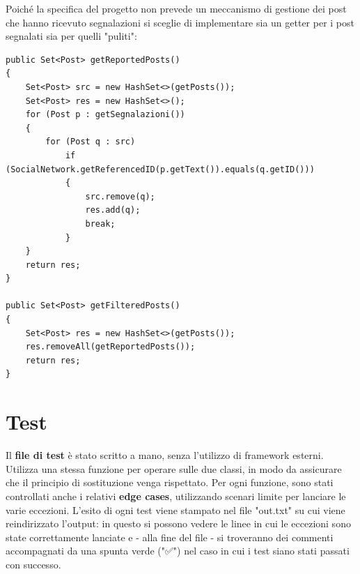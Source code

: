 \documentclass[10pt, italian, openany]{book}
\begin{document}
Poich\'e la specifica del progetto non prevede un meccanismo di gestione dei post che hanno ricevuto segnalazioni si sceglie di implementare sia un getter per i post segnalati sia per quelli "puliti":
\begin{lstlisting}[style=codeStyle]
public Set<Post> getReportedPosts()
{
    Set<Post> src = new HashSet<>(getPosts());
    Set<Post> res = new HashSet<>();
    for (Post p : getSegnalazioni())
    {
        for (Post q : src)
            if (SocialNetwork.getReferencedID(p.getText()).equals(q.getID()))
            {
                src.remove(q);
                res.add(q);
                break;
            }
    }
    return res;
}

public Set<Post> getFilteredPosts()
{
    Set<Post> res = new HashSet<>(getPosts());
    res.removeAll(getReportedPosts());
    return res;
}
\end{lstlisting}


\section{Test}
Il \textbf{file di test} \`e stato scritto a mano, senza l'utilizzo di framework esterni. Utilizza una stessa funzione per operare sulle due classi, 
in modo da assicurare che il principio di sostituzione venga rispettato. Per ogni funzione, sono stati controllati anche i relativi \textbf{edge cases}, 
utilizzando scenari limite per lanciare le varie eccezioni. L'esito di ogni test viene stampato nel file "out.txt" su cui viene reindirizzato l'output:
in questo si possono vedere le linee in cui le eccezioni sono state correttamente lanciate e - alla fine del file - si troveranno dei commenti accompagnati da una spunta verde ("✅")
nel caso in cui i test siano stati passati con successo.
\end{document}
